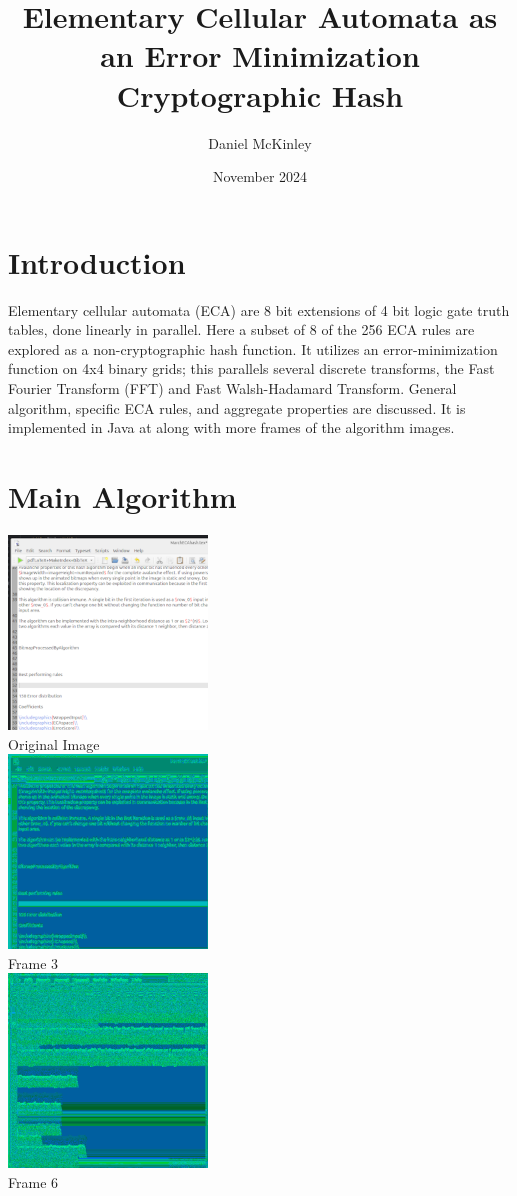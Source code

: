 \documentclass[11pt]{article}
\title{Elementary Cellular Automata as an Error Minimization Cryptographic Hash}
\date{November 2024}
\author{Daniel McKinley}
\begin{document}
\maketitle

\section{Introduction}

Elementary cellular automata (ECA) are 8 bit extensions of 4 bit logic gate truth tables, done linearly in parallel. \cite{Wolfram}
Here a subset of 8 of the 256 ECA rules are explored as a non-cryptographic hash function. It utilizes an error-minimization function on 4x4 binary grids; this parallels several discrete transforms, the Fast Fourier Transform (FFT) and Fast Walsh-Hadamard Transform. General algorithm, specific ECA rules, and aggregate properties are discussed. It is implemented in Java at \cite{mygit} along with more frames of the algorithm images. \\
\section{Main Algorithm}

\begin{center}
\includegraphics{testScreenshot}\\
Original Image\\
\includegraphics{processedDepth3}\\
Frame 3\\
\includegraphics{processedDepth6}\\
Frame 6\\
\end{center}
\end{document}
